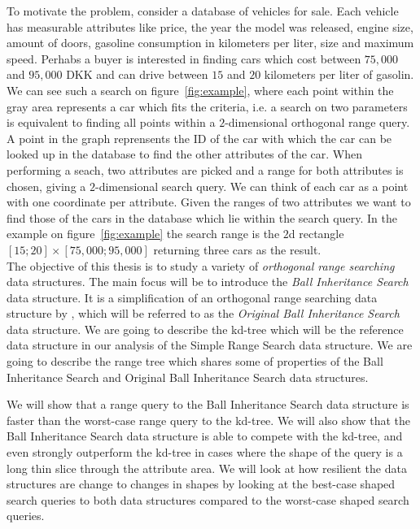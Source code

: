 \noindent To motivate the problem, consider a database of vehicles for sale. Each vehicle has measurable attributes like price, the year the model was released, engine size, amount of doors, gasoline consumption in kilometers per liter, size  and maximum speed. Perhabs a buyer is interested in finding cars which cost between $75,000$ and $95,000$ DKK and can drive between $15$ and $20$ kilometers per liter of gasolin. We can see such a search on figure~\ref{fig:example}, where each point within the gray area represents a car which fits the criteria, i.e. a search on two parameters is equivalent to finding all points within a $2$-dimensional orthogonal range query. A point in the graph reprensents the ID of the car with which the car can be looked up in the database to find the other attributes of the car. When performing a seach, two attributes are picked and a range for both attributes is chosen, giving a $2$-dimensional search query. We can think of each car as a point with one coordinate per attribute. Given the ranges of two attributes we want to find those of the cars in the database which lie within the search query. In the example on figure~\ref{fig:example} the search range is the $2$d rectangle $[15;20] \times [75,000;95,000]$ returning three cars as the result. \\

The objective of this thesis is to study a variety of \emph{orthogonal range searching} data structures. The main focus will be to introduce the \emph{Ball Inheritance Search} data structure. It is a simplification of an orthogonal range searching data structure by \citet{chanetal}, which will be referred to as the \emph{Original Ball Inheritance Search} data structure. We are going to describe the kd-tree which will be the reference data structure in our analysis of the Simple Range Search data structure. We are going to describe the range tree which shares some of properties of the Ball Inheritance Search and Original Ball Inheritance Search data structures.

We will show that a range query to the Ball Inheritance Search data structure is faster than the worst-case range query to the kd-tree. We will also show that the Ball Inheritance Search data structure is able to compete with the kd-tree, and even strongly outperform the kd-tree in cases where the shape of the query is a long thin slice through the attribute area. We will look at how resilient the data structures are change to changes in shapes by looking at the best-case shaped search queries to both data structures compared to the worst-case shaped search queries. \\ 


